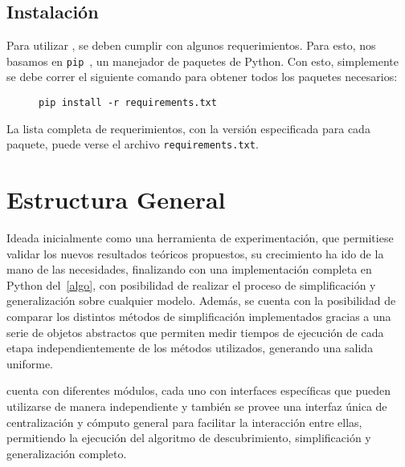 
\subsection*{Instalación}
Para utilizar \pachtool, se deben cumplir con algunos requerimientos. Para esto, 
nos basamos en \texttt{pip}~\cite{pip}, un manejador de paquetes de Python. Con esto,
simplemente se debe correr el siguiente comando para obtener todos los
paquetes necesarios:

\begin{figure}[H]
    \centering
    \begin{Verbatim}[frame=single,fontsize=\scriptsize]
        pip install -r requirements.txt
    \end{Verbatim}
    \label{ej:pip_install}
\end{figure}

La lista completa de requerimientos, con la versión especificada para cada paquete,
puede verse el archivo \texttt{requirements.txt}.

\section{Estructura General}
\label{sec:4.general}

Ideada inicialmente como una herramienta de experimentación,
que permitiese validar los nuevos resultados teóricos propuestos, su crecimiento ha ido de la mano
de las necesidades, finalizando con una implementación completa en Python del~\autoref{algo},
con posibilidad de realizar el proceso de simplificación y generalización sobre cualquier modelo.
Además, se cuenta con la posibilidad de comparar los distintos métodos de simplificación
implementados gracias a una serie de objetos abstractos que permiten medir tiempos de 
ejecución de cada etapa independientemente de los métodos utilizados, 
generando una salida uniforme.

\pachtool cuenta con diferentes módulos, cada uno con interfaces específicas que pueden utilizarse de manera
independiente y también se provee una interfaz única de centralización y cómputo general para 
facilitar la interacción entre ellas, permitiendo la ejecución del algoritmo 
de descubrimiento, simplificación y generalización completo.

